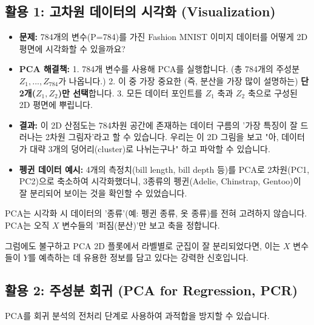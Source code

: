 \documentclass[11pt,a4paper]{book}
\theoremstyle{definition}
\begin{document}
\subsection{활용 1: 고차원 데이터의 시각화 (Visualization)}
\begin{itemize}
    \item \textbf{문제:} 784개의 변수(P=784)를 가진 Fashion MNIST 이미지 데이터를 어떻게 2D 평면에 시각화할 수 있을까요?
    \item \textbf{PCA 해결책:}
        1. 784개 변수를 사용해 PCA를 실행합니다. (총 784개의 주성분 $Z_1, ..., Z_{784}$가 나옵니다.)
        2. 이 중 가장 중요한 (즉, 분산을 가장 많이 설명하는) \textbf{단 2개($Z_1, Z_2$)만 선택}합니다.
        3. 모든 데이터 포인트를 $Z_1$ 축과 $Z_2$ 축으로 구성된 2D 평면에 뿌립니다.
    \item \textbf{결과:} 이 2D 산점도는 784차원 공간에 존재하는 데이터 구름의 '가장 특징이 잘 드러나는 2차원 그림자'라고 할 수 있습니다. 우리는 이 2D 그림을 보고 "아, 데이터가 대략 3개의 덩어리(cluster)로 나뉘는구나" 하고 파악할 수 있습니다.
    \item \textbf{펭귄 데이터 예시:} 4개의 측정치(bill length, bill depth 등)를 PCA로 2차원(PC1, PC2)으로 축소하여 시각화했더니, 3종류의 펭귄(Adelie, Chinstrap, Gentoo)이 잘 분리되어 보이는 것을 확인할 수 있었습니다.
\end{itemize}

\begin{warningbox}[title={PCA는 Y(라벨)를 모른다 (Unsupervised)}]
PCA는 시각화 시 데이터의 '종류'(예: 펭귄 종류, 옷 종류)를 전혀 고려하지 않습니다. PCA는 오직 $X$ 변수들의 '퍼짐(분산)'만 보고 축을 정합니다.

그럼에도 불구하고 PCA 2D 플롯에서 라벨별로 군집이 잘 분리되었다면, 이는 $X$ 변수들이 $Y$를 예측하는 데 유용한 정보를 담고 있다는 강력한 신호입니다.
\end{warningbox}

\subsection{활용 2: 주성분 회귀 (PCA for Regression, PCR)}
PCA를 회귀 분석의 전처리 단계로 사용하여 과적합을 방지할 수 있습니다.
\end{document}
